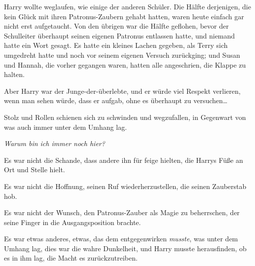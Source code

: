Harry wollte weglaufen, wie einige der anderen Schüler. Die Hälfte derjenigen, die kein Glück mit ihren Patronus-Zaubern gehabt hatten, waren heute einfach gar nicht erst aufgetaucht. Von den übrigen war die Hälfte geflohen, bevor der Schulleiter überhaupt seinen eigenen Patronus entlassen hatte, und niemand hatte ein Wort gesagt. Es hatte ein kleines Lachen gegeben, als Terry sich umgedreht hatte und noch vor seinem eigenen Versuch zurückging; und Susan und Hannah, die vorher gegangen waren, hatten alle angeschrien, die Klappe zu halten.

Aber Harry war der Junge-der-überlebte, und er würde viel Respekt verlieren, wenn man sehen würde, dass er aufgab, ohne es überhaupt zu versuchen…

Stolz und Rollen schienen sich zu schwinden und wegzufallen, in Gegenwart von was auch immer unter dem Umhang lag.

\emph{Warum bin ich immer noch hier?}

Es war nicht die Schande, dass andere ihn für feige hielten, die Harrys Füße an Ort und Stelle hielt.

Es war nicht die Hoffnung, seinen Ruf wiederherzustellen, die seinen Zauberstab hob.

Es war nicht der Wunsch, den Patronus-Zauber als Magie zu beherrschen, der seine Finger in die Ausgangsposition brachte.

Es war etwas anderes, etwas, das dem entgegenwirken \emph{musste}, was unter dem Umhang lag, dies war die wahre Dunkelheit, und Harry musste herausfinden, ob es in ihm lag, die Macht es zurückzutreiben.

